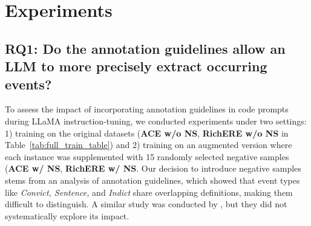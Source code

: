 \section{Experiments}




\subsection{RQ1: Do the annotation guidelines allow an LLM to more precisely extract occurring events?}


To assess the impact of incorporating annotation guidelines in code prompts during LLaMA instruction-tuning, we conducted experiments under two settings: 1) training on the original datasets (\textbf{ACE w/o NS}, \textbf{RichERE w/o NS} in Table~\ref{tab:full_train_table}) and 2) training on an augmented version where each instance was supplemented with 15 randomly selected negative samples (\textbf{ACE w/ NS}, \textbf{RichERE w/ NS}. Our decision to introduce negative samples stems from an analysis of annotation guidelines, which showed that event types like \textit{Convict, Sentence,} and \textit{Indict} share overlapping definitions, making them difficult to distinguish. 
A similar study was conducted by \citet{Degree}, but they did not systematically explore its impact.   

